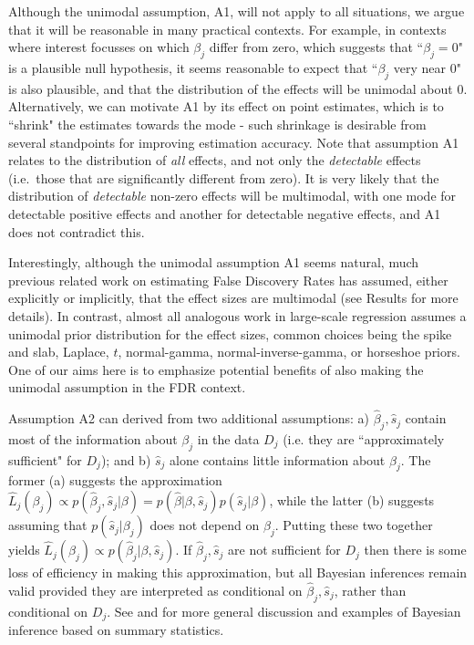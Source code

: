 \documentclass[11pt]{article}
\def\bhat{\hat{\beta}}
\def\shat{\hat{s}}
\begin{document}
Although the unimodal assumption, A1, will not apply to all situations, we argue that it will be reasonable in many practical contexts. 
For example, in contexts where interest focusses on which $\beta_j$ differ from zero, which suggests that ``$\beta_j=0$" is a plausible null hypothesis,  
it seems reasonable to expect that ``$\beta_j$ very near 0" is also plausible, and that the distribution of the effects will be unimodal about 0. 
Alternatively, we can motivate A1 by its effect on point estimates, which is to ``shrink" the estimates towards the mode - 
such shrinkage is desirable from several standpoints for improving estimation accuracy. 
Note that assumption A1 relates to the distribution of {\it all} effects, and not only the {\it detectable} effects (i.e.~those that are significantly different from zero). It is very likely that the distribution of {\it detectable} non-zero effects will be multimodal, with one mode for detectable positive effects and another for detectable negative effects, and A1 does not contradict this.

Interestingly, although the unimodal assumption A1 seems natural, much previous related work on estimating False Discovery Rates  
has assumed, either explicitly or implicitly, that the effect sizes are multimodal (see Results for more details). 
In contrast, almost all analogous work in large-scale regression assumes
a unimodal prior distribution for the effect sizes, common choices being the spike and slab, Laplace, $t$, normal-gamma, normal-inverse-gamma, or horseshoe priors.
One of our aims here is to emphasize potential benefits of also making the unimodal assumption in the FDR context.

Assumption A2 can derived from two additional assumptions: a) $\bhat_j, \shat_j$ contain most of the information about $\beta_j$ in the data $D_j$ (i.e. they are ``approximately sufficient" for $D_j$); and b) $\shat_j$ alone contains little information about $\beta_j$. The former (a) suggests the approximation $\hat{L}_j(\beta_j) \propto p(\bhat_j, \shat_j | \beta) = p(\bhat | \beta, \shat_j) p(\shat_j | \beta)$, while the latter (b) suggests assuming that $p(\shat_j|\beta_j)$ does not depend on $\beta_j$. Putting these two together yields $\hat{L}_j(\beta_j) \propto p(\bhat_j | \beta, \shat_j)$. If $\bhat_j, \shat_j$ are not sufficient for $D_j$ then there is some loss of efficiency in making this approximation, but all Bayesian inferences remain valid provided they are interpreted as conditional on $\bhat_j,\shat_j$, rather than conditional on $D_j$. See \cite{johnson:2008} and \cite{wakefield:2009} for more general discussion and examples of Bayesian inference based on summary statistics. 
\end{document}
